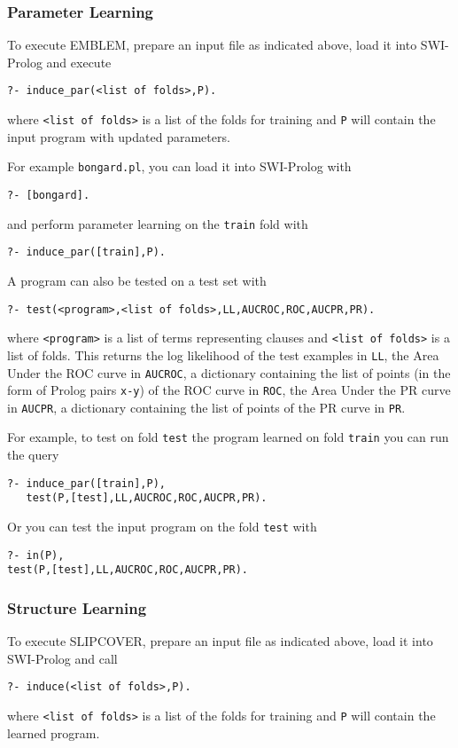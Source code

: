 \documentclass[a4paper,10pt]{article}
\begin{document}
\subsubsection{Parameter Learning}
To execute EMBLEM, prepare an input file as indicated above,
 load it into SWI-Prolog and execute
\begin{verbatim}
?- induce_par(<list of folds>,P).
\end{verbatim}
where \verb|<list of folds>| is a list of the folds for training and
\verb|P| will contain the input program with updated parameters.

For example \verb|bongard.pl|, you can load it into SWI-Prolog
with
\begin{verbatim}
?- [bongard].
\end{verbatim}
and perform parameter learning on the \verb|train| fold with 
\begin{verbatim}
?- induce_par([train],P).
\end{verbatim}
A program can also be tested on a test set with
\begin{verbatim}
?- test(<program>,<list of folds>,LL,AUCROC,ROC,AUCPR,PR).
\end{verbatim}
where \verb|<program>| is a list of terms representing clauses and
\verb|<list of folds>| is a list of folds.
This returns the log likelihood of the test examples in \verb|LL|, the Area Under the ROC curve in \verb|AUCROC|, a dictionary containing the list of points (in the form of Prolog pairs \verb|x-y|) of the ROC curve in \verb|ROC|,
the Area Under the PR curve in \verb|AUCPR|, a dictionary containing the list of points of the PR curve in \verb|PR|.

For example, to test on fold \verb|test| the program learned on fold \verb|train| you can run the query
\begin{verbatim}
?- induce_par([train],P),
   test(P,[test],LL,AUCROC,ROC,AUCPR,PR).
\end{verbatim}
Or you can test the input program on the fold \verb|test| with
\begin{verbatim}
?- in(P),
test(P,[test],LL,AUCROC,ROC,AUCPR,PR).
\end{verbatim}

\subsubsection{Structure Learning}
To execute SLIPCOVER,
prepare an input file as indicated above, load it into SWI-Prolog
and call
\begin{verbatim}
?- induce(<list of folds>,P).
\end{verbatim}
where \verb|<list of folds>| is a list of the folds for training and
\verb|P| will contain the learned program.
\end{document}
